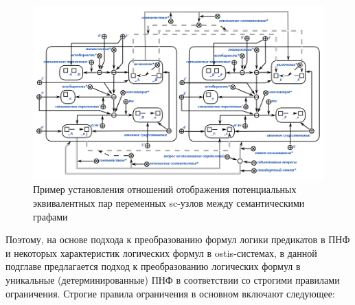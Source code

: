 \begin{figure}[H]
	\includegraphics[scale=0.65]{author/part7/figures/establishment_mapping_relationship_example.png}
	\caption{Пример установления отношений отображения потенциальных эквивалентных пар переменных sc-узлов между семантическими графами}
	\label{fig:EMR_example}
\end{figure}

Поэтому, на основе подхода к преобразованию формул логики предикатов в ПНФ и некоторых характеристик логических формул в ostis-системах, в данной подглаве предлагается подход к преобразованию логических формул в уникальные (детерминированные) ПНФ в соответствии со строгими правилами ограничения. Строгие правила ограничения в основном включают следующее:

